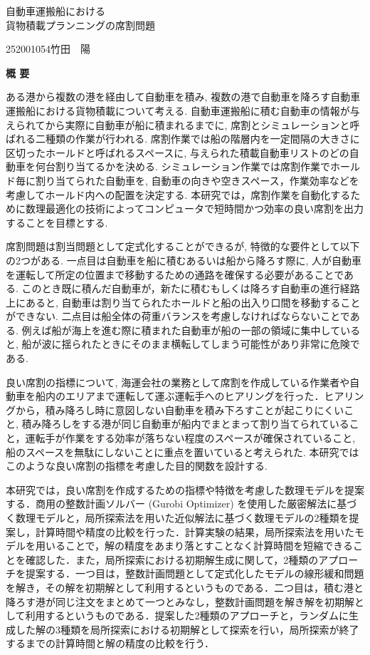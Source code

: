 \begin{center}
{\LARGE 自動車運搬船における \\ 貨物積載プランニングの席割問題}\\[0.5cm]
\end{center}
\hfill
{\large 252001054\qquad 竹田　陽}\\[0.5cm]
\begin{center}
{\Large \bf 概 要}\\
\end{center}

ある港から複数の港を経由して自動車を積み, 複数の港で自動車を降ろす自動車運搬船における貨物積載について考える. 自動車運搬船に積む自動車の情報が与えられてから実際に自動車が船に積まれるまでに, 席割とシミュレーションと呼ばれる二種類の作業が行われる. 席割作業では船の階層内を一定間隔の大きさに区切ったホールドと呼ばれるスペースに, 与えられた積載自動車リストのどの自動車を何台割り当てるかを決める. シミュレーション作業では席割作業でホールド毎に割り当てられた自動車を, 自動車の向きや空きスペース，作業効率などを考慮してホールド内への配置を決定する. 本研究では，席割作業を自動化するために数理最適化の技術によってコンピュータで短時間かつ効率の良い席割を出力することを目標とする.

席割問題は割当問題として定式化することができるが, 特徴的な要件として以下の2つがある. 一点目は自動車を船に積むあるいは船から降ろす際に, 人が自動車を運転して所定の位置まで移動するための通路を確保する必要があることである. このとき既に積んだ自動車が，新たに積むもしくは降ろす自動車の進行経路上にあると, 自動車は割り当てられたホールドと船の出入り口間を移動することができない. 二点目は船全体の荷重バランスを考慮しなければならないことである. 例えば船が海上を進む際に積まれた自動車が船の一部の領域に集中していると, 船が波に揺られたときにそのまま横転してしまう可能性があり非常に危険である.

良い席割の指標について, 海運会社の業務として席割を作成している作業者や自動車を船内のエリアまで運転して運ぶ運転手へのヒアリングを行った．ヒアリングから，積み降ろし時に意図しない自動車を積み下ろすことが起こりにくいこと, 積み降ろしをする港が同じ自動車が船内でまとまって割り当てられていること，運転手が作業をする効率が落ちない程度のスペースが確保されていること, 船のスペースを無駄にしないことに重点を置いていると考えられた. 本研究ではこのような良い席割の指標を考慮した目的関数を設計する.

本研究では，良い席割を作成するための指標や特徴を考慮した数理モデルを提案する．商用の整数計画ソルバー (Gurobi Optimizer) を使用した厳密解法に基づく数理モデルと，局所探索法を用いた近似解法に基づく数理モデルの2種類を提案し，計算時間や精度の比較を行った．計算実験の結果，局所探索法を用いたモデルを用いることで，解の精度をあまり落とすことなく計算時間を短縮できることを確認した．また，局所探索における初期解生成に関して，2種類のアプローチを提案する．一つ目は，整数計画問題として定式化したモデルの線形緩和問題を解き，その解を初期解として利用するというものである．二つ目は，積む港と降ろす港が同じ注文をまとめて一つとみなし，整数計画問題を解き解を初期解として利用するというものである．提案した2種類のアプローチと，ランダムに生成した解の3種類を局所探索における初期解として探索を行い，局所探索が終了するまでの計算時間と解の精度の比較を行う．
